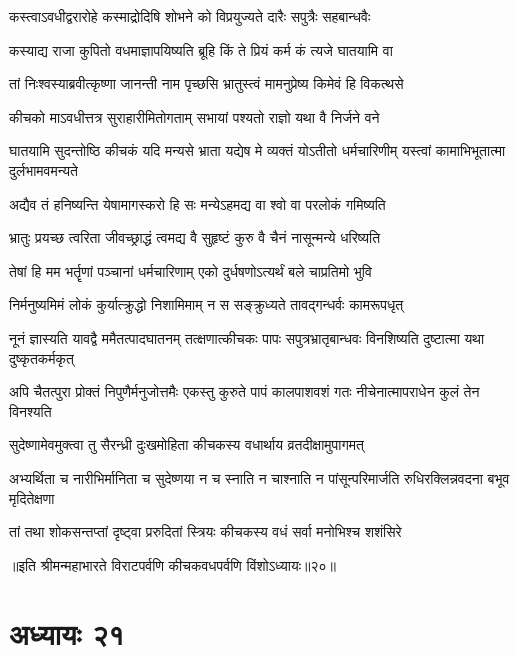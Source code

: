 \twolineshloka
{कस्त्वाऽवधीद्वरारोहे कस्माद्रोदिषि शोभने}
{को विप्रयुज्यते दारैः सपुत्रैः सहबान्धवैः}


\twolineshloka
{कस्याद्य राजा कुपितो वधमाज्ञापयिष्यति}
{ब्रूहि किं ते प्रियं कर्म कं त्यजे घातयामि वा}



\twolineshloka
{तां निःश्वस्याब्रवीत्कृष्णा जानन्ती नाम पृच्छसि}
{भ्रातुस्त्वं मामनुप्रेष्य किमेवं हि विकत्थसे}


\twolineshloka
{कीचको माऽवधीत्तत्र सुराहारीमितोगताम्}
{सभायां पश्यतो राज्ञो यथा वै निर्जने वने}




\threelineshloka
{घातयामि सुदन्तोष्ठि कीचकं यदि मन्यसे}
{भ्राता यद्येष मे व्यक्तं योऽतीतो धर्मचारिणीम्}
{यस्त्वां कामाभिभूतात्मा दुर्लभामवमन्यते}



\twolineshloka
{अद्यैव तं हनिष्यन्ति येषामागस्करो हि सः}
{मन्येऽहमद्य वा श्वो वा परलोकं गमिष्यति}


\twolineshloka
{भ्रातुः प्रयच्छ त्वरिता जीवच्छ्राद्धं त्वमद्य वै}
{सुहृष्टं कुरु वै चैनं नासून्मन्ये धरिष्यति}


\twolineshloka
{तेषां हि मम भर्तॄणां पञ्चानां धर्मचारिणाम्}
{एको दुर्धषणोऽत्यर्थं बले चाप्रतिमो भुवि}


\twolineshloka
{निर्मनुष्यमिमं लोकं कुर्यात्क्रुद्धो निशामिमाम्}
{न स सङ्क्रुध्यते तावद्गन्धर्वः कामरूपधृत्}


\threelineshloka
{नूनं ज्ञास्यति यावद्वै ममैतत्पादघातनम्}
{तत्क्षणात्कीचकः पापः सपुत्रभ्रातृबान्धवः}
{विनशिष्यति दुष्टात्मा यथा दुष्कृतकर्मकृत्}


\threelineshloka
{अपि चैतत्पुरा प्रोक्तं निपुणैर्मनुजोत्तमैः}
{एकस्तु कुरुते पापं कालपाशवशं गतः}
{नीचेनात्मापराधेन कुलं तेन विनश्यति}



\twolineshloka
{सुदेष्णामेवमुक्त्वा तु सैरन्ध्री दुःखमोहिता}
{कीचकस्य वधार्थाय व्रतदीक्षामुपागमत्}


\threelineshloka
{अभ्यर्थिता च नारीभिर्मानिता च सुदेष्णया}
{न च स्नाति न चाश्नाति न पांसून्परिमार्जति}
{रुधिरक्लिन्नवदना बभूव मृदितेक्षणा}


\twolineshloka
{तां तथा शोकसन्तप्तां दृष्ट्वा प्ररुदितां स्त्रियः}
{कीचकस्य वधं सर्वा मनोभिश्च शशंसिरे}

॥इति श्रीमन्महाभारते विराटपर्वणि कीचकवधपर्वणि विंशोऽध्यायः॥२०॥

\chapter{अध्यायः २१}

